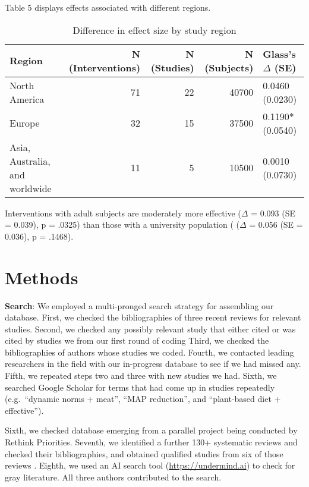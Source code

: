 \documentclass[sn-nature,referee,pdflatex]{sn-jnl}
\begin{document}
Table 5 displays effects associated with different regions.

\begin{table}[!h]
\centering
\caption{\label{tab:table_five}Difference in effect size by study region}
\centering
\begin{tabular}[t]{lrrrl}
\toprule
Region & N (Interventions) & N (Studies) & N (Subjects) & Glass's $\Delta$ (SE)\\
\midrule
North America & 71 & 22 & 40700 & 0.0460 (0.0230)\\
Europe & 32 & 15 & 37500 & 0.1190* (0.0540)\\
Asia, Australia, and worldwide & 11 & 5 & 10500 & 0.0010 (0.0730)\\
\bottomrule
\end{tabular}
\end{table}

Interventions with adult subjects are moderately more effective
(\(\Delta\) = 0.093 (SE = 0.039), p = .0325) than those with a
university population ( (\(\Delta\) = 0.056 (SE = 0.036), p = .1468).

\section{Methods}\label{sec3}

\textbf{Search}: We employed a multi-pronged search strategy for
assembling our database. First, we checked the bibliographies of three
recent reviews
\citep{mathur2021meta, bianchi2018conscious, bianchi2018restructuring}
for relevant studies. Second, we checked any possibly relevant study
that either cited or was cited by studies we from our first round of
coding Third, we checked the bibliographies of authors whose studies we
coded. Fourth, we contacted leading researchers in the field with our
in-progress database to see if we had missed any. Fifth, we repeated
steps two and three with new studies we had. Sixth, we searched Google
Scholar for terms that had come up in studies repeatedly (e.g.~``dynamic
norms + meat'', ``MAP reduction'', and ``plant-based diet +
effective'').

\begin{comment} 
does this need more description? This is not entirely reproducible I think but TBH it was not a major source of studies in our database
\end{comment}

Sixth, we checked database emerging from a parallel project being
conducted by Rethink Priorities. Seventh, we identified a further 130+
systematic reviews and checked their bibliographies, and obtained
qualified studies from six of those reviews
\citep{ammann2023, chang2023, DiGennaro2024, harguess2020, ronto2022, wynes2018}.
Eighth, we used an AI search tool (\url{https://undermind.ai}) to check
for gray literature. All three authors contributed to the search.
\end{document}

